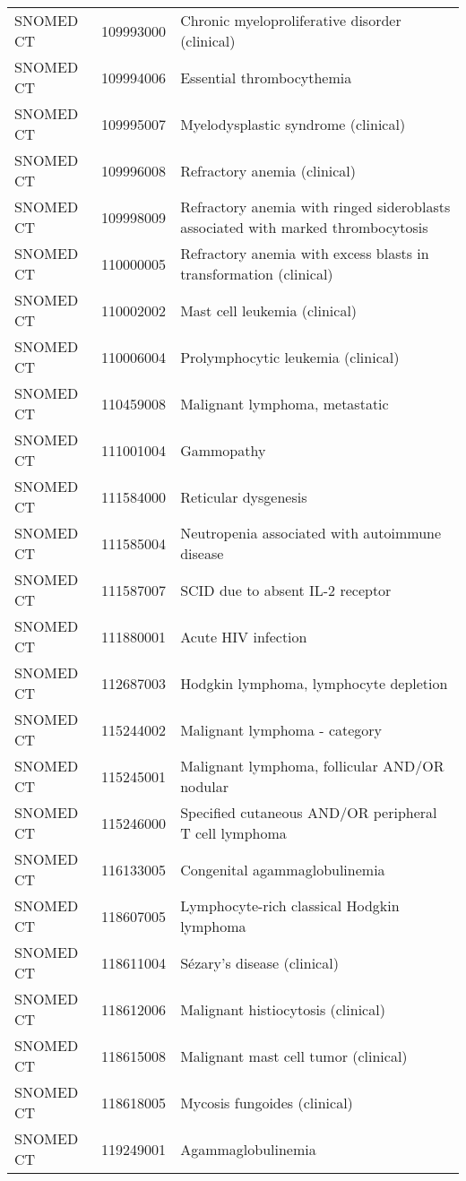 \begin{longtable}{p{}p{}p{}}
  SNOMED CT & 109993000 & Chronic myeloproliferative disorder (clinical) \\ 
  SNOMED CT & 109994006 & Essential thrombocythemia \\ 
  SNOMED CT & 109995007 & Myelodysplastic syndrome (clinical) \\ 
  SNOMED CT & 109996008 & Refractory anemia (clinical) \\ 
  SNOMED CT & 109998009 & Refractory anemia with ringed sideroblasts associated with marked thrombocytosis \\ 
  SNOMED CT & 110000005 & Refractory anemia with excess blasts in transformation (clinical) \\ 
  SNOMED CT & 110002002 & Mast cell leukemia (clinical) \\ 
  SNOMED CT & 110006004 & Prolymphocytic leukemia (clinical) \\ 
  SNOMED CT & 110459008 & Malignant lymphoma, metastatic \\ 
  SNOMED CT & 111001004 & Gammopathy \\ 
  SNOMED CT & 111584000 & Reticular dysgenesis \\ 
  SNOMED CT & 111585004 & Neutropenia associated with autoimmune disease \\ 
  SNOMED CT & 111587007 & SCID due to absent IL-2 receptor \\ 
  SNOMED CT & 111880001 & Acute HIV infection \\ 
  SNOMED CT & 112687003 & Hodgkin lymphoma, lymphocyte depletion \\ 
  SNOMED CT & 115244002 & Malignant lymphoma - category \\ 
  SNOMED CT & 115245001 & Malignant lymphoma, follicular AND/OR nodular \\ 
  SNOMED CT & 115246000 & Specified cutaneous AND/OR peripheral T cell lymphoma \\ 
  SNOMED CT & 116133005 & Congenital agammaglobulinemia \\ 
  SNOMED CT & 118607005 & Lymphocyte-rich classical Hodgkin lymphoma \\ 
  SNOMED CT & 118611004 & Sézary's disease (clinical) \\ 
  SNOMED CT & 118612006 & Malignant histiocytosis (clinical) \\ 
  SNOMED CT & 118615008 & Malignant mast cell tumor (clinical) \\ 
  SNOMED CT & 118618005 & Mycosis fungoides (clinical) \\ 
  SNOMED CT & 119249001 & Agammaglobulinemia \\ 

\end{longtable}
